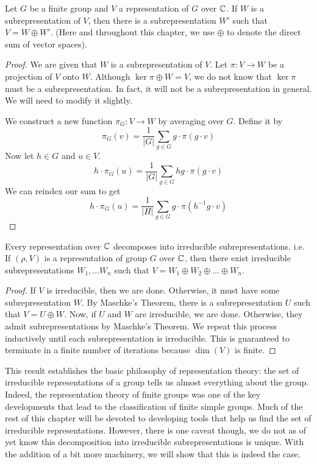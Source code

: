 \begin{theorem}
    Let $G$ be a finite group and $V$ a representation of $G$ over $\mathbb{C}$. If $W$ is a subrepresentation of $V$, then 
there is a subrepresentation $W'$ such that $V = W \oplus W'$. (Here and throughout this chapter, we use $\oplus$ 
to denote the direct sum of vector spaces).
\end{theorem}


\begin{proof}
    We are given that $W$ is a subrepresentation of $V$. Let $\pi : V \rightarrow W$ be a projection of $V$ onto 
    $W$. Although $\ker \pi \oplus W = V$, we do not know that $\ker \pi$ must be a subrepresentation. In fact, it 
    will not be a subrepresentation in general. We will need to modify it slightly.

    We construct a new function $\pi_G : V \rightarrow W$ by averaging over $G$. Define it by
    \[
        \pi_G(v) = \frac{1}{|G|}\sum_{g \in G} g \cdot \pi(g \cdot v) \]
    Now let $h \in G$ and $u \in V$.
    \[
        h \cdot \pi_G(u) = \frac{1}{|G|} \sum_{g \in G} hg \cdot \pi(g \cdot v)
    \]
    We can reindex our sum to get
    \[
        h \cdot \pi_G (u) = \frac{1}{|H|} \sum_{g \in G} g \cdot \pi(h^{-1}g \cdot v)
    \]
    
\end{proof}



\begin{theorem}
    Every representation over $\mathbb{C}$ decomposes into irreducible subrepresentations. i.e.
    If $(\rho, V)$ is a representation of group $G$ over $\mathbb{C}$, then there exist irreducible subrepresentations 
    $W_1, ...  W_n$ such that $V = W_1 \oplus W_2 \oplus ... \oplus W_n$.
\end{theorem}

\begin{proof}
    If $V$ is irreducible, then we are done. Otherwise, it must have some subrepresentation $W$. By Maschke's 
    Theorem, there is a subrepresentation $U$ such that $V = U \oplus W$. Now, if $U$ and $W$ are irreducible, we 
    are done. Otherwise, they admit subrepresentations by Maschke's Theorem. We repeat this process inductively 
    until each subrepresentation is irreducible. This is guaranteed to terminate in a finite number of iterations 
    because $\dim(V)$ is finite.
\end{proof}
This result establishes the basic philosophy of representation theory: the set of irreducible representations of a 
group tells us almost everything about the group.  Indeed, the representation theory of finite groups was one of 
the key developments that lead to the classification of finite simple groups.  Much of the rest of this chapter 
will be devoted to developing tools that help us find the set of irreducible representations. However, there is one 
caveat though, we do not as of yet know this decomposition into irreducible subrepresentations is unique. With the 
addition of a bit more machinery, we will show that this is indeed the case.
 
